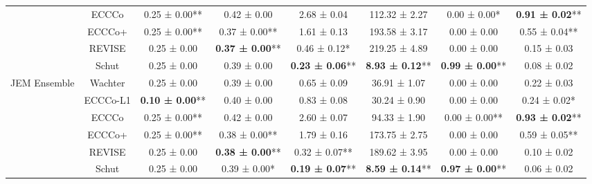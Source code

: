 \begin{table}
{\begin{tabular}[t]{cccccccc}
 & ECCCo & 0.25 ± 0.00** & 0.42 ± 0.00\hphantom{*}\hphantom{*} & 2.68 ± 0.04\hphantom{*}\hphantom{*} & 112.32 ± 2.27\hphantom{*}\hphantom{*} & 0.00 ± 0.00*\hphantom{*} & \textbf{0.91 ± 0.02}**\\

 & ECCCo+ & 0.25 ± 0.00** & 0.37 ± 0.00** & 1.61 ± 0.13\hphantom{*}\hphantom{*} & 193.58 ± 3.17\hphantom{*}\hphantom{*} & 0.00 ± 0.00\hphantom{*}\hphantom{*} & 0.55 ± 0.04**\\

 & REVISE & 0.25 ± 0.00\hphantom{*}\hphantom{*} & \textbf{0.37 ± 0.00}** & 0.46 ± 0.12*\hphantom{*} & 219.25 ± 4.89\hphantom{*}\hphantom{*} & 0.00 ± 0.00\hphantom{*}\hphantom{*} & 0.15 ± 0.03\hphantom{*}\hphantom{*}\\

 & Schut & 0.25 ± 0.00\hphantom{*}\hphantom{*} & 0.39 ± 0.00\hphantom{*}\hphantom{*} & \textbf{0.23 ± 0.06}** & \textbf{8.93 ± 0.12}** & \textbf{0.99 ± 0.00}** & 0.08 ± 0.02\hphantom{*}\hphantom{*}\\

\multirow[t]{-6}{*}{\centering\arraybackslash JEM Ensemble} & Wachter & 0.25 ± 0.00\hphantom{*}\hphantom{*} & 0.39 ± 0.00\hphantom{*}\hphantom{*} & 0.65 ± 0.09\hphantom{*}\hphantom{*} & 36.91 ± 1.07\hphantom{*}\hphantom{*} & 0.00 ± 0.00\hphantom{*}\hphantom{*} & 0.22 ± 0.03\hphantom{*}\hphantom{*}\\
\cmidrule{1-8}
 & ECCCo-L1 & \textbf{0.10 ± 0.00}** & 0.40 ± 0.00\hphantom{*}\hphantom{*} & 0.83 ± 0.08\hphantom{*}\hphantom{*} & 30.24 ± 0.90\hphantom{*}\hphantom{*} & 0.00 ± 0.00\hphantom{*}\hphantom{*} & 0.24 ± 0.02*\hphantom{*}\\

 & ECCCo & 0.25 ± 0.00** & 0.42 ± 0.00\hphantom{*}\hphantom{*} & 2.60 ± 0.07\hphantom{*}\hphantom{*} & 94.33 ± 1.90\hphantom{*}\hphantom{*} & 0.00 ± 0.00** & \textbf{0.93 ± 0.02}**\\

 & ECCCo+ & 0.25 ± 0.00** & 0.38 ± 0.00** & 1.79 ± 0.16\hphantom{*}\hphantom{*} & 173.75 ± 2.75\hphantom{*}\hphantom{*} & 0.00 ± 0.00\hphantom{*}\hphantom{*} & 0.59 ± 0.05**\\

 & REVISE & 0.25 ± 0.00\hphantom{*}\hphantom{*} & \textbf{0.38 ± 0.00}** & 0.32 ± 0.07** & 189.62 ± 3.95\hphantom{*}\hphantom{*} & 0.00 ± 0.00\hphantom{*}\hphantom{*} & 0.10 ± 0.02\hphantom{*}\hphantom{*}\\

 & Schut & 0.25 ± 0.00\hphantom{*}\hphantom{*} & 0.39 ± 0.00*\hphantom{*} & \textbf{0.19 ± 0.07}** & \textbf{8.59 ± 0.14}** & \textbf{0.97 ± 0.00}** & 0.06 ± 0.02\hphantom{*}\hphantom{*}\\


\end{tabular}}
\end{table}
